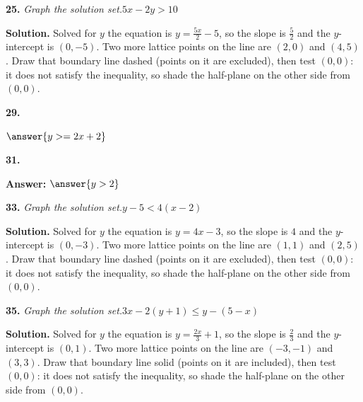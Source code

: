 \documentclass{ximera}
\begin{document}
\begin{problem}
\textbf{25.} \emph{Graph the solution set.}\quad $5x - 2y > 10$            \figbox{\gridsm}

\begin{hint}
\textbf{Solution.} Solved for $y$ the equation is $y=\frac{5x}{2} - 5$, so the slope is $\frac{5}{2}$ and the $y$-intercept is $(0,-5)$. Two more lattice points on the line are $(2,0)$ and $(4,5)$. Draw that boundary line dashed (points on it are excluded), then test $(0,0)$: it does not satisfy the inequality, so shade the half-plane on the other side from $(0,0)$.
\end{hint}
\end{problem}

\begin{problem}
\textbf{29.} 

$ \answer{y >= 2x+2}$
\end{problem}

\begin{problem}
\textbf{31.} 

\textbf{Answer:} $\answer{y>2}$
\end{problem}

\begin{problem}
\textbf{33.} \emph{Graph the solution set.}\quad $y - 5 < 4(x - 2)$                \figbox{\gridsm}

\begin{hint}
\textbf{Solution.} Solved for $y$ the equation is $y=4x - 3$, so the slope is $4$ and the $y$-intercept is $(0,-3)$. Two more lattice points on the line are $(1,1)$ and $(2,5)$. Draw that boundary line dashed (points on it are excluded), then test $(0,0)$: it does not satisfy the inequality, so shade the half-plane on the other side from $(0,0)$.
\end{hint}
\end{problem}

\begin{problem}
\textbf{35.} \emph{Graph the solution set.}\quad $3x - 2(y + 1) \le y - (5 - x)$   \figbox{\gridsm}

\begin{hint}
\textbf{Solution.} Solved for $y$ the equation is $y=\frac{2x}{3} + 1$, so the slope is $\frac{2}{3}$ and the $y$-intercept is $(0,1)$. Two more lattice points on the line are $(-3,-1)$ and $(3,3)$. Draw that boundary line solid (points on it are included), then test $(0,0)$: it does not satisfy the inequality, so shade the half-plane on the other side from $(0,0)$.
\end{hint}
\end{problem}
\end{document}

